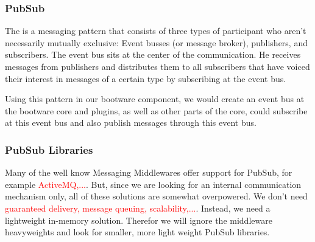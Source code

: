 \subsubsection{PubSub}

The  is a messaging pattern that consists of three types of participant who aren't necessarily mutually exclusive: Event busses (or message broker), publishers, and subscribers.
The event bus sits at the center of the communication.
He receives messages from publishers and distributes them to all subscribers that have voiced their interest in messages of a certain type by subscribing at the event bus.

Using this pattern in our bootware component, we would create an event bus at the bootware core and plugins, as well as other parts of the core, could subscribe at this event bus and also publish messages through this event bus.

\subsubsection{PubSub Libraries}

Many of the well know Messaging Middlewares offer support for PubSub, for example \textcolor{red}{ActiveMQ,...}.
But, since we are looking for an internal communication mechanism only, all of these solutions are somewhat overpowered.
We don't need \textcolor{red}{guaranteed delivery, message queuing, scalability,...}.
Instead, we need a lightweight in-memory solution.
Therefor we will ignore the middleware heavyweights and look for smaller, more light weight PubSub libraries.

